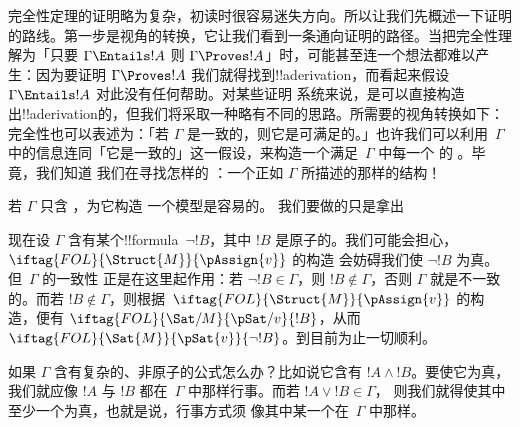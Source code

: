\documentclass[../../../include/open-logic-section]{subfiles}
\begin{document}
      {}
      {}


完全性定理的证明略为复杂，初读时很容易迷失方向。所以让我们先概述一下证明的路线。第一步是视角的转换，它让我们看到一条通向证明的路径。当把完全性理解为「只要 $\Gamma
\Entails !A$ 则 $\Gamma \Proves !A$」时，可能甚至连一个想法都难以产生：因为要证明 $\Gamma \Proves !A$ 我们就得找到!!a{derivation}，而看起来假设
$\Gamma \Entails !A$ 对此没有任何帮助。对某些证明
系统来说，是可以直接构造出!!a{derivation}的，但我们将采取一种略有不同的思路。所需要的视角转换如下：完全性也可以表述为：「若
$\Gamma$ 是一致的，则它是可满足的。」也许我们可以利用~$\Gamma$ 中的信息连同「它是一致的」这一假设，来构造一个满足~$\Gamma$ 中每一个 
的 。毕竟，我们知道
我们在寻找怎样的 ：一个正如 $\Gamma$ 所描述的那样的结构！{}

若 $\Gamma$ 只含 ，为它构造
一个模型是容易的。 我们要做的只是拿出

现在设 $\Gamma$ 含有某个!!{formula}~$\lnot !B$，其中 $!B$
是原子的。我们可能会担心，$\iftag{FOL}{\Struct{M}}{\pAssign{v}}$ 的构造
会妨碍我们使 $\lnot !B$ 为真。但~$\Gamma$ 的一致性
正是在这里起作用：若 $\lnot !B \in \Gamma$，则 $!B \notin
\Gamma$，否则 $\Gamma$ 就是不一致的。而若 $!B \notin
\Gamma$，则根据~$\iftag{FOL}{\Struct{M}}{\pAssign{v}}$ 的构造，便有
$\iftag{FOL}{\Sat/{M}}{\pSat/{v}}{!B}$，从而
$\iftag{FOL}{\Sat{M}}{\pSat{v}}{\lnot !B}$。到目前为止一切顺利。

如果 $\Gamma$ 含有复杂的、非原子的公式怎么办？比如说它含有
$!A \land !B$。要使它为真，我们就应像 $!A$ 与 $!B$ 都在~$\Gamma$ 中那样行事。而若 $!A \lor !B \in \Gamma$，
则我们就得使其中至少一个为真，也就是说，行事方式须
像其中某一个在~$\Gamma$ 中那样。
\end{document}
